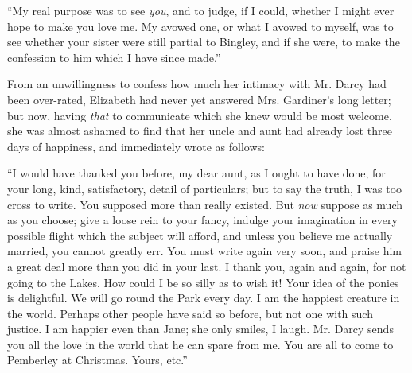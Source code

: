 

“My real purpose was to see {\em you}, and to judge, if I could, whether I might ever hope to make you love me. My avowed one, or what I avowed to myself, was to see whether your sister were still partial to Bingley, and if she were, to make the confession to him which I have since made.”




From an unwillingness to confess how much her intimacy with Mr. Darcy had been over-rated, Elizabeth had never yet answered Mrs. Gardiner's long letter; but now, having {\em that} to communicate which she knew would be most welcome, she was almost ashamed to find that her uncle and aunt had already lost three days of happiness, and immediately wrote as follows:

“I would have thanked you before, my dear aunt, as I ought to have done, for your long, kind, satisfactory, detail of particulars; but to say the truth, I was too cross to write. You supposed more than really existed. But {\em now} suppose as much as you choose; give a loose rein to your fancy, indulge your imagination in every possible flight which the subject will afford, and unless you believe me actually married, you cannot greatly err. You must write again very soon, and praise him a great deal more than you did in your last. I thank you, again and again, for not going to the Lakes. How could I be so silly as to wish it! Your idea of the ponies is delightful. We will go round the Park every day. I am the happiest creature in the world. Perhaps other people have said so before, but not one with such justice. I am happier even than Jane; she only smiles, I laugh. Mr. Darcy sends you all the love in the world that he can spare from me. You are all to come to Pemberley at Christmas. Yours, etc.”

